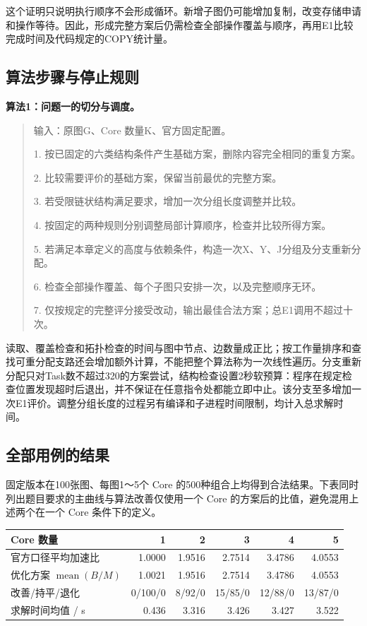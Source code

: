 \documentclass[anonymous,notoc]{gmcm2026}
\begin{document}
这个证明只说明执行顺序不会形成循环。新增子图仍可能增加复制，改变存储申请和操作等待。因此，形成完整方案后仍需检查全部操作覆盖与顺序，再用E1比较完成时间及代码规定的COPY统计量。

\subsection{算法步骤与停止规则}

\textbf{算法1：问题一的切分与调度。}

\begin{quote}
输入：原图G、Core 数量K、官方固定配置。

1. 按已固定的六类结构条件产生基础方案，删除内容完全相同的重复方案。

2. 比较需要评价的基础方案，保留当前最优的完整方案。

3. 若受限链状结构满足要求，增加一次分组长度调整并比较。

4. 按固定的两种规则分别调整局部计算顺序，检查并比较所得方案。

5. 若满足本章定义的高度与依赖条件，构造一次X、Y、J分组及分支重新分配。

6. 检查全部操作覆盖、每个子图只安排一次，以及完整顺序无环。

7. 仅按规定的完整评分接受改动，输出最佳合法方案；总E1调用不超过十次。
\end{quote}

读取、覆盖检查和拓扑检查的时间与图中节点、边数量成正比；按工作量排序和查找可重分配支路还会增加额外计算，不能把整个算法称为一次线性遍历。分支重新分配只对Task数不超过320的方案尝试，结构检查设置2秒软预算：程序在规定检查位置发现超时后退出，并不保证在任意指令处都能立即中止。该分支至多增加一次E1评价。调整分组长度的过程另有编译和子进程时间限制，均计入总求解时间。

\subsection{全部用例的结果}

固定版本在100张图、每图1～5个 Core 的500种组合上均得到合法结果。下表同时列出题目要求的主曲线与算法改善仅使用一个 Core 的方案后的比值，避免混用上述两个在一个 Core 条件下的定义。

\begin{table}[!htbp]\centering\small
\begin{tabularx}{\linewidth}{@{}Xrrrrr@{}}\toprule
Core 数量 & 1 & 2 & 3 & 4 & 5 \\
\midrule
官方口径平均加速比 & 1.0000 & 1.9516 & 2.7514 & 3.4786 & 4.0553 \\
优化方案 $\operatorname{mean}(B/M)$ & 1.0021 & 1.9516 & 2.7514 & 3.4786 & 4.0553 \\
改善/持平/退化 & 0/100/0 & 8/92/0 & 15/85/0 & 12/88/0 & 13/87/0 \\
求解时间均值 / s & 0.436 & 3.316 & 3.426 & 3.427 & 3.522 \\
\bottomrule\end{tabularx}\end{table}
\end{document}
